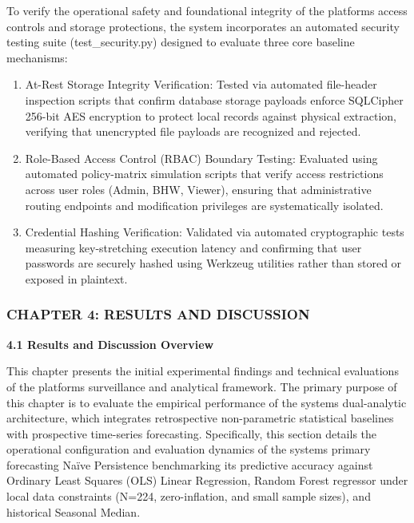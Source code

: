 \documentclass[
]{article}
\begin{document}
To verify the operational safety and foundational integrity of the
platform\textquotesingle s access controls and storage protections, the
system incorporates an automated security testing suite
(test\_security.py) designed to evaluate three core baseline mechanisms:

\begin{enumerate}
\def\labelenumi{\arabic{enumi}.}
\item
  At-Rest Storage Integrity Verification: Tested via automated
  file-header inspection scripts that confirm database storage payloads
  enforce SQLCipher 256-bit AES encryption to protect local records
  against physical extraction, verifying that unencrypted file payloads
  are recognized and rejected.
\item
  Role-Based Access Control (RBAC) Boundary Testing: Evaluated using
  automated policy-matrix simulation scripts that verify access
  restrictions across user roles (Admin, BHW, Viewer), ensuring that
  administrative routing endpoints and modification privileges are
  systematically isolated.
\item
  Credential Hashing Verification: Validated via automated cryptographic
  tests measuring key-stretching execution latency and confirming that
  user passwords are securely hashed using Werkzeug utilities rather
  than stored or exposed in plaintext.
\end{enumerate}

\subsubsection{\texorpdfstring{\textbf{CHAPTER 4: RESULTS AND
DISCUSSION}}{CHAPTER 4: RESULTS AND DISCUSSION}}\label{chapter-4-results-and-discussion}

\textbf{4.1 Results and Discussion Overview}

This chapter presents the initial experimental findings and technical
evaluations of the platform\textquotesingle s surveillance and
analytical framework. The primary purpose of this chapter is to evaluate
the empirical performance of the system\textquotesingle s dual-analytic
architecture, which integrates retrospective non-parametric statistical
baselines with prospective time-series forecasting. Specifically, this
section details the operational configuration and evaluation dynamics of
the system\textquotesingle s primary forecasting Naïve Persistence
benchmarking its predictive accuracy against Ordinary Least Squares
(OLS) Linear Regression, Random Forest regressor under local data
constraints (N=224, zero-inflation, and small sample sizes), and
historical Seasonal Median.
\end{document}
